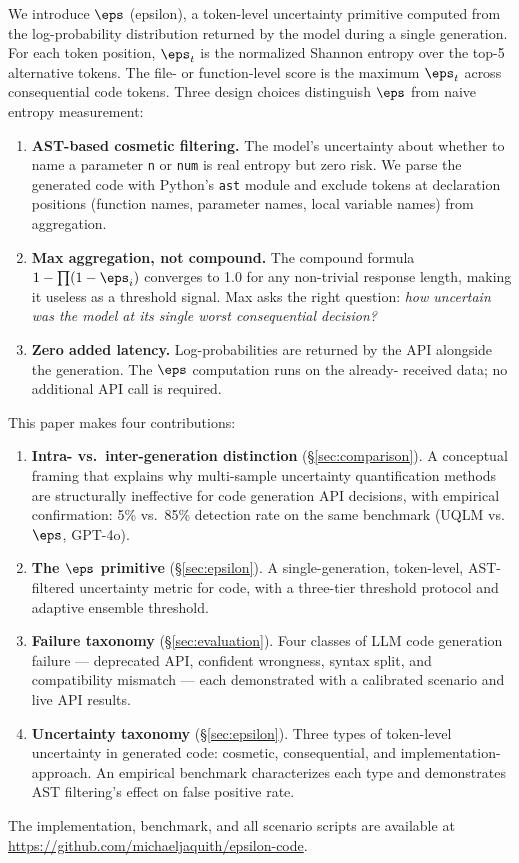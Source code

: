 We introduce $\eps$ (epsilon), a token-level uncertainty primitive computed
from the log-probability distribution returned by the model during a single
generation. For each token position, $\eps_t$ is the normalized Shannon entropy
over the top-5 alternative tokens. The file- or function-level score is the
maximum $\eps_t$ across consequential code tokens.
Three design choices distinguish $\eps$ from naive entropy measurement:

\begin{enumerate}[noitemsep]
  \item \textbf{AST-based cosmetic filtering.} The model's uncertainty about
    whether to name a parameter \texttt{n} or \texttt{num} is real entropy but
    zero risk. We parse the generated code with Python's \texttt{ast} module
    and exclude tokens at declaration positions (function names, parameter
    names, local variable names) from aggregation.

  \item \textbf{Max aggregation, not compound.} The compound formula
    $1 - \prod(1 - \eps_i)$ converges to 1.0 for any non-trivial response
    length, making it useless as a threshold signal. Max asks the right
    question: \emph{how uncertain was the model at its single worst consequential
    decision?}

  \item \textbf{Zero added latency.} Log-probabilities are returned by the
    API alongside the generation. The $\eps$ computation runs on the already-
    received data; no additional API call is required.
\end{enumerate}

This paper makes four contributions:

\begin{enumerate}[noitemsep]
  \item \textbf{Intra- vs.\ inter-generation distinction} (\S\ref{sec:comparison}).
    A conceptual framing that explains why multi-sample uncertainty quantification
    methods are structurally ineffective for code generation API decisions, with
    empirical confirmation: 5\% vs.\ 85\% detection rate on the same benchmark
    (UQLM vs.\ $\eps$, GPT-4o).

  \item \textbf{The $\eps$ primitive} (\S\ref{sec:epsilon}).
    A single-generation, token-level, AST-filtered uncertainty metric for code,
    with a three-tier threshold protocol and adaptive ensemble threshold.

  \item \textbf{Failure taxonomy} (\S\ref{sec:evaluation}).
    Four classes of LLM code generation failure --- deprecated API, confident
    wrongness, syntax split, and compatibility mismatch --- each demonstrated
    with a calibrated scenario and live API results.

  \item \textbf{Uncertainty taxonomy} (\S\ref{sec:epsilon}).
    Three types of token-level uncertainty in generated code: cosmetic,
    consequential, and implementation-approach. An empirical benchmark
    characterizes each type and demonstrates AST filtering's effect on
    false positive rate.
\end{enumerate}

The implementation, benchmark, and all scenario scripts are available at
\url{https://github.com/michaeljaquith/epsilon-code}.

